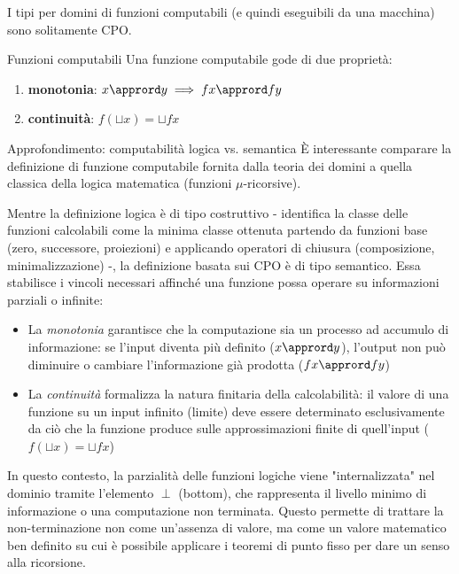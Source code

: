 I tipi per domini di funzioni computabili (e quindi eseguibili da una macchina) sono solitamente CPO.

\begin{defframe}{Funzioni computabili}{}
    Una funzione computabile gode di due proprietà:
    \vspace{-0.5em}
    \begin{enumerate}
        \item \textbf{monotonia}: $x \apprord y \implies f x \apprord f y$
        \item \textbf{continuità}: $f(\sqcup x) = \sqcup f x$
    \end{enumerate}
\end{defframe}

\begin{gframe}{Approfondimento: computabilità logica vs. semantica}
È interessante comparare la definizione di funzione computabile fornita dalla teoria dei domini a quella classica della logica matematica (funzioni $\mu$-ricorsive). 

Mentre la definizione logica è di tipo costruttivo - identifica la classe delle funzioni calcolabili come la minima classe ottenuta partendo da funzioni base (zero, successore, proiezioni) e applicando operatori di chiusura (composizione, minimalizzazione) -, la definizione basata sui CPO è di tipo semantico. Essa stabilisce i vincoli necessari affinché una funzione possa operare su informazioni parziali o infinite:

\begin{itemize}
    \item La \textit{monotonia} garantisce che la computazione sia un processo ad accumulo di informazione: se l'input diventa più definito ($x \apprord y$), l'output non può diminuire o cambiare l'informazione già prodotta ($f x \apprord f y$)
    \item La \textit{continuità} formalizza la natura finitaria della calcolabilità: il valore di una funzione su un input infinito (limite) deve essere determinato esclusivamente da ciò che la funzione produce sulle approssimazioni finite di quell'input ($f(\sqcup x) = \sqcup f x$)
\end{itemize}

In questo contesto, la parzialità delle funzioni logiche viene "internalizzata" nel dominio tramite l'elemento $\perp$ (bottom), che rappresenta il livello minimo di informazione o una computazione non terminata. Questo permette di trattare la non-terminazione non come un'assenza di valore, ma come un valore matematico ben definito su cui è possibile applicare i teoremi di punto fisso per dare un senso alla ricorsione.
\end{gframe}

